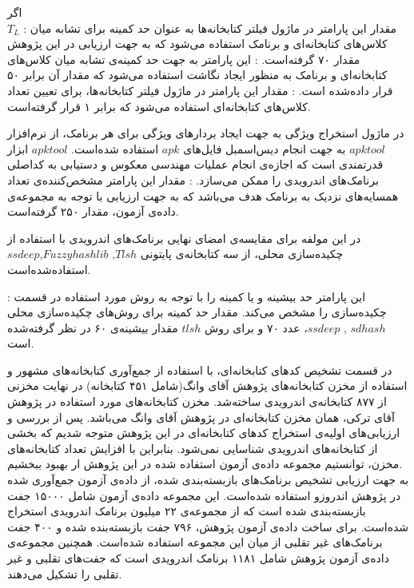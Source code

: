 ‌اگر\\
 $T_{L}$
: مقدار این پارامتر در ماژول فیلتر کتابخانه‌ها به عنوان حد کمینه برای تشابه میان کلاس‌های کتابخانه‌ای و برنامک استفاده می‌شود که به جهت ارزیابی در این پژوهش مقدار ۷۰ گرفته‌است.
: این پارامتر به جهت حد کمینه‌ی تشابه میان کلاس‌های کتابخانه‌ای و برنامک به منظور ایجاد نگاشت استفاده می‌شود که مقدار آن برابر ۵۰ قرار داده‌شده است.
: مقدار این پارامتر در ماژول فیلتر کتابخانه‌ها، برای تعیین تعداد کلاس‌های کتابخانه‌ای استفاده می‌شود که برابر ۱ قرار گرفته‌است.


در ماژول استخراج ویژگی به جهت ایجاد بردار‌های ویژگی برای هر برنامک، از نرم‌افزار $apktool$ به جهت انجام دیس‌اسمبل فایل‌های $apk$ استفاده شده‌است. $apktool$ ابزار قدرتمندی است که اجازه‌ی انجام عملیات مهندسی معکوس و دستیابی به کداصلی برنامک‌های اندرویدی را ممکن می‌سازد.
: مقدار این پارامتر مشخص‌کننده‌ی تعداد همسایه‌های نزدیک به برنامک هدف می‌باشد که به جهت ارزیابی با توجه به مجموعه‌‌ی داده‌ی آزمون، مقدار ۲۵۰ گرفته‌است.


در این مولفه برای مقایسه‌ی امضای نهایی برنامک‌های اندرویدی با استفاده از چکیده‌سازی محلی، از سه کتابخانه‌ی پایتونی $Tlsh$, $Fuzzyhashlib$,$ssdeep$ استفاده‌شده‌است. 

: این پارامتر حد بیشینه و یا کمینه را با توجه به روش مورد استفاده‌ در قسمت چکیده‌سازی را مشخص می‌کند. مقدار حد کمینه برای روش‌های چکیده‌سازی محلی $sdhash$ , $ssdeep$، عدد ۷۰ و برای روش $tlsh$ مقدار بیشینه‌ی ۶۰ در نظر گرفته‌شده است.



در قسمت تشخیص کد‌های کتابخانه‌ای، با استفاده از جمع‌آوری کتابخانه‌های مشهور و استفاده از مخزن کتابخانه‌های پژوهش آقای وانگ(شامل ۴۵۱ کتابخانه) در نهایت مخزنی از ۸۷۷ کتابخانه‌ی اندرویدی ساخته‌شد. مخزن کتابخانه‌های مورد استفاده در پژوهش آقای ترکی، همان مخزن کتابخانه‌ای در پژوهش آقای وانگ می‌باشد. پس از بررسی و ارزیابی‌های اولیه‌ی استخراج کد‌های کتابخانه‌ای در این پژوهش متوجه شدیم که بخشی از کتابخانه‌های اندرویدی شناسایی نمی‌شود. بنابراین با افزایش تعداد کتابخانه‌های مخزن، توانستیم مجموعه‌ داده‌ی آزمون استفاده شده در این پژوهش ار بهبود ببخشیم.\\
به جهت ارزیابی تشخیص برنامک‌های بازبسته‌بندی شده، از داده‌ی آزمون جمع‌آوری شده در پژوهش اندروزو استفاده شده‌است. این مجموعه‌ داده‌‌ی آزمون شامل ۱۵۰۰۰ جفت بازبسته‌بندی شده است که از مجموعه‌ی ۲۲ میلیون برنامک اندرویدی استخراج شده‌است. برای ساخت داده‌ی آزمون پژوهش، ۷۹۶ جفت بازبسته‌بنده شده و ۴۰۰ جفت برنامک‌های غیر تقلبی از میان این مجموعه استفاده شده‌است. همچنین مجموعه‌ی داده‌ی آزمون پژوهش شامل ۱۱۸۱ برنامک اندرویدی است که جفت‌های تقلبی و غیر تقلبی را تشکیل می‌دهند.


